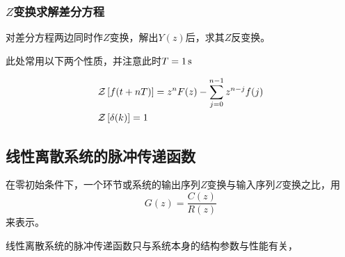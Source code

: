 \subsubsection{$Z$变换求解差分方程}

对差分方程两边同时作$Z$变换，解出$Y(z)$后，求其$Z$反变换。

此处常用以下两个性质，并注意此时$T=1\,{\rm s}$

\begin{align}
    & \mathcal{Z}\left[f(t+nT)\right] = z^n F(z) - \sum_{j=0}^{n-1} z^{n-j} f(j) \\
    & \mathcal{Z}\left[\delta(k)\right] = 1
\end{align}

\subsection{线性离散系统的脉冲传递函数}

\begin{definition}[脉冲传递函数]
    在零初始条件下，一个环节或系统的输出序列$Z$变换与输入序列$Z$变换之比，用
    \begin{equation}
        G(z) = \frac{C(z)}{R(z)}
    \end{equation}
    来表示。
\end{definition}

线性离散系统的脉冲传递函数只与系统本身的结构参数与性能有关，

